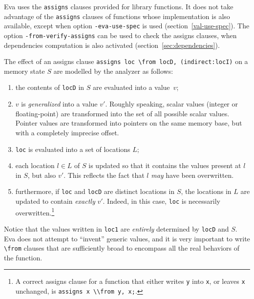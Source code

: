 \documentclass[web]{frama-c-book}
\newcommand{\Eva}{\textsf{Eva}}
\begin{document}
\Eva{} uses the \lstinline|assigns| clauses provided for
library functions. It does not take advantage of the
\lstinline|assigns| clauses of functions whose implementation is also
available, except when option \lstinline|-eva-use-spec| is used
(section~\ref{val-use-spec}). The option
\lstinline|-from-verify-assigns| can be used to check the assigns
clauses, when dependencies computation is also activated
(section~\ref{sec:dependencies}).



The effect of an assigns clause
\lstinline|assigns loc \from locD, (indirect:locI)| on a memory state $S$
are modelled by the analyzer as follows:
\begin{enumerate}
\item the contents of \lstinline|locD| in $S$ are evaluated into a value~$v$;

\item $v$ is \emph{generalized} into a value $v'$. Roughly speaking, scalar
  values (integer or floating-point) are transformed into the set of all
  possible scalar values. Pointer values are transformed into pointers on
  the same memory base, but with a completely imprecise offset.

\item \lstinline|loc| is evaluated into a set of locations $L$;

\item each location $l \in L$ of $S$ is updated so that it contains
  the values present at $l$ in $S$, but also $v'$. This reflects the
  fact that $l$ \emph{may} have been overwritten.

\item furthermore, if \lstinline|loc| and \lstinline|locD| are
  distinct locations in $S$, the locations in $L$ are updated to
  contain \emph{exactly} $v'$. Indeed, in this case, \lstinline|loc| is
  necessarily overwritten.\footnote{A correct assigns clause for a function
    that either writes \lstinline|y| into \lstinline|x|, or leaves
    \lstinline|x| unchanged, is \lstinline|assigns x \\from y, x;|.}

\end{enumerate}
Notice that the values written in \lstinline|loc1| are \emph{entirely}
determined by \lstinline|locD| and $S$. \Eva{} does not attempt
to ``invent'' generic values, and it is very important to write
\lstinline|\from| clauses that are sufficiently broad to encompass all
the real behaviors of the function.
\end{document}
